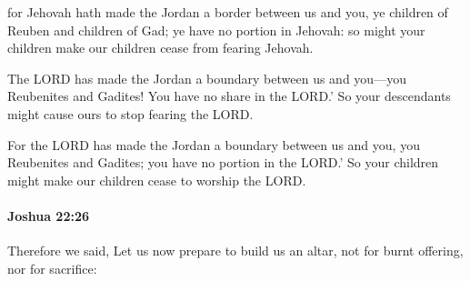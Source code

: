 			\begin{versebox}
					\item[BHS] 
					\item[ASV] for Jehovah hath made the Jordan a border between us and you, ye children of Reuben and children of Gad; ye have no portion in Jehovah: so might your children make our children cease from fearing Jehovah.
					\item[NIV] The LORD has made the Jordan a boundary between us and you—you Reubenites and Gadites! You have no share in the LORD.’ So your descendants might cause ours to stop fearing the LORD.
					\item[NRSV] For the LORD has made the Jordan a boundary between us and you, you Reubenites and Gadites; you have no portion in the LORD.’ So your children might make our children cease to worship the LORD.
			\end{versebox}

		\paragraph{Joshua 22:26} %
			\label{JOSHUA-22-26}

			Therefore we said, Let us now prepare to build us an altar, not for burnt offering, nor for sacrifice:

